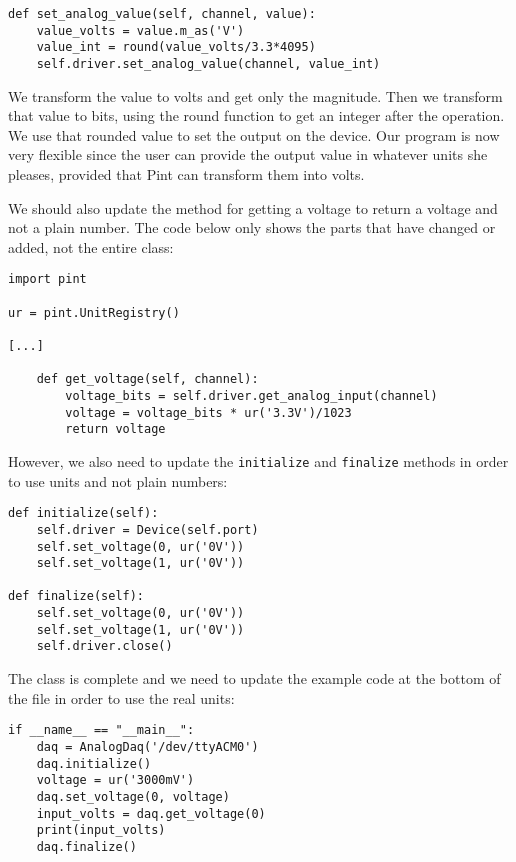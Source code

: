 \begin{verbatim}
def set_analog_value(self, channel, value):
    value_volts = value.m_as('V')
    value_int = round(value_volts/3.3*4095)
    self.driver.set_analog_value(channel, value_int)
\end{verbatim}

We transform the value to volts and get only the magnitude. Then we transform that value to bits, using the round function to get an integer after the operation. We use that rounded value to set the output on the device. Our program is now very flexible since the user can provide the output value in whatever units she pleases, provided that Pint can transform them into volts.


We should also update the method for getting a voltage to return a voltage and not a plain number. The code below only shows the parts that have changed or added, not the entire class:

\begin{verbatim}
import pint

ur = pint.UnitRegistry()

[...]

    def get_voltage(self, channel):
        voltage_bits = self.driver.get_analog_input(channel)
        voltage = voltage_bits * ur('3.3V')/1023
        return voltage
\end{verbatim}

However, we also need to update the \texttt{initialize} and \texttt{finalize} methods in order to use units and not plain numbers:

\begin{verbatim}
def initialize(self):
    self.driver = Device(self.port)
    self.set_voltage(0, ur('0V'))
    self.set_voltage(1, ur('0V'))

def finalize(self):
    self.set_voltage(0, ur('0V'))
    self.set_voltage(1, ur('0V'))
    self.driver.close()
\end{verbatim}

The class is complete and we need to update the example code at the bottom of the file in order to use the real units:

\begin{verbatim}
if __name__ == "__main__":
    daq = AnalogDaq('/dev/ttyACM0')
    daq.initialize()
    voltage = ur('3000mV')
    daq.set_voltage(0, voltage)
    input_volts = daq.get_voltage(0)
    print(input_volts)
    daq.finalize()
\end{verbatim}

